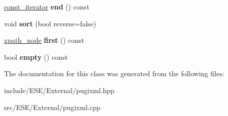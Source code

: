 \begin{DoxyCompactItemize}
\item 
\hypertarget{classpugi_1_1xpath__node__set_a8dea1d6fc28789d909936805ed1afcd8}{\hyperlink{classpugi_1_1xpath__node}{const\-\_\-iterator} {\bfseries end} () const }\label{classpugi_1_1xpath__node__set_a8dea1d6fc28789d909936805ed1afcd8}

\item 
\hypertarget{classpugi_1_1xpath__node__set_a7f264ad9a2736e9dc2d6a2de25cb67d1}{void {\bfseries sort} (bool reverse=false)}\label{classpugi_1_1xpath__node__set_a7f264ad9a2736e9dc2d6a2de25cb67d1}

\item 
\hypertarget{classpugi_1_1xpath__node__set_a89c35cc7c823b842b8afeccc796aa6f9}{\hyperlink{classpugi_1_1xpath__node}{xpath\-\_\-node} {\bfseries first} () const }\label{classpugi_1_1xpath__node__set_a89c35cc7c823b842b8afeccc796aa6f9}

\item 
\hypertarget{classpugi_1_1xpath__node__set_a854e0b24839e8fdaa6b14bbd66e7ce98}{bool {\bfseries empty} () const }\label{classpugi_1_1xpath__node__set_a854e0b24839e8fdaa6b14bbd66e7ce98}

\end{DoxyCompactItemize}


The documentation for this class was generated from the following files\-:\begin{DoxyCompactItemize}
\item 
include/\-E\-S\-E/\-External/pugixml.\-hpp\item 
src/\-E\-S\-E/\-External/pugixml.\-cpp\end{DoxyCompactItemize}
